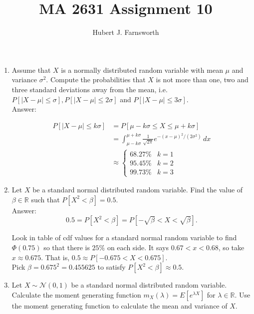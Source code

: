 \documentclass{article}
\title{MA 2631 Assignment 10}
\author{Hubert J. Farnsworth}
\begin{document}
\maketitle

\begin{enumerate}

\item

Assume that $X$ is a normally distributed random variable with mean $\mu$ and variance $\sigma^2$.
Compute the probabilities that $X$ is not more than one, two and three standard
deviations away from the mean, i.e. $P[|X -\mu| \leq\sigma], P[|X -\mu| \leq 2\sigma]$ and
$P[|X -\mu| \leq 3\sigma]$.\\

Answer:

\begin{align*}
P[|X-\mu| \leq k \sigma] &= P[\mu -k\sigma \leq X  \leq \mu + k\sigma] \\
&= \int_{\mu - k\sigma}^{\mu + k\sigma} \frac{1}{\sqrt{2\pi}} e^{-(x-\mu)^2 / (2\sigma^2)} \, dx \\
&\approx \begin{cases}
68.27 \% & k = 1 \\
95.45 \% & k = 2 \\
99.73 \% & k = 3
\end{cases}
\end{align*}

\item 

Let $X$ be a standard normal distributed random variable. Find the value of $\beta \in \mathbb{R}$  such that $P[X^2 < \beta]= 0.5$. \\

Answer:
$$
0.5 = P[X^2 < \beta] = P[-\sqrt{\beta} < X < \sqrt{\beta}].
$$

Look in table of cdf values for a standard normal random variable to find $\Phi(0.75)$ so that there is $25\%$ on each side. It says $0.67 < x < 0.68$, so take $x \approx 0.675$. That is, $0.5 \approx P[-0.675 < X < 0.675]$.\\

Pick $\beta = 0.675^2 = \boxed{0.455625}$ to satisfy $P[X^2 < \beta] \approx 0.5$.

\newpage
\item

Let $X \sim \mathcal{N}(0,1)$ be a standard normal distributed random variable. Calculate the
moment generating function $m_X(\lambda) = E[e^{\lambda X}]$ for $\lambda \in \mathbb{R}$. Use the moment generating function to calculate the mean and variance of $X$. \\


\end{enumerate}
\end{document}
